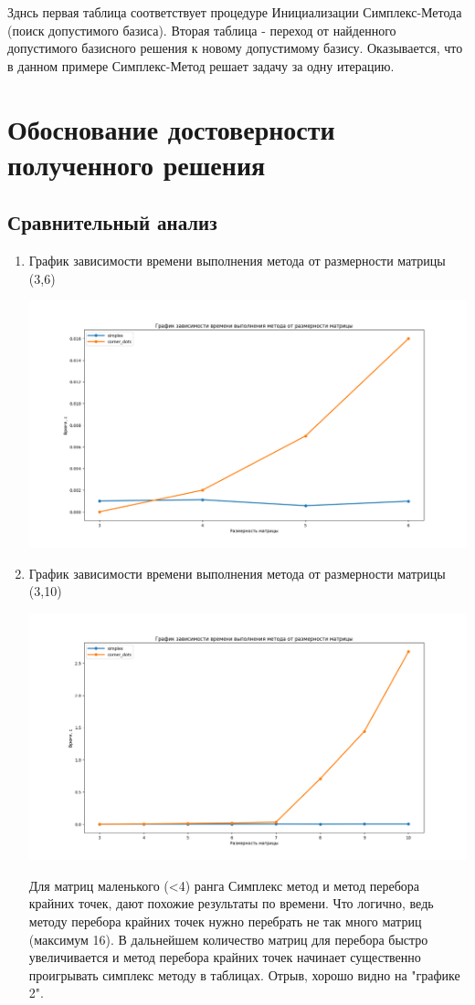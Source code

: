 \documentclass{article}
\begin{document}
    Зднсь первая таблица соответствует процедуре Инициализации Симплекс-Метода (поиск допустимого базиса). Вторая таблица - переход от найденного допустимого базисного решения к новому допустимому базису. Оказывается, что в данном примере Симплекс-Метод решает задачу за одну итерацию.

\newpage
	\section{Обоснование достоверности полученного решения}
    \subsection{Сравнительный анализ}
    \begin{enumerate}
        \item График зависимости времени выполнения метода от размерности матрицы (3,6)
        \begin{center}
         \includegraphics[width=\textwidth]{../graphics/Time_small_rangs_1.png}
        \end{center}
        \item График зависимости времени выполнения метода от размерности матрицы (3,10)
        \begin{center}
         \includegraphics[width=\textwidth]{../graphics/time_3_11_1.png}
        \end{center}
        Для матриц маленького (<4) ранга Симплекс метод и метод перебора крайних точек,
	дают похожие результаты по времени. Что логично, ведь методу перебора крайних точек
	нужно перебрать не так много матриц (максимум 16). В дальнейшем количество матриц для перебора быстро увеличивается
	и метод перебора крайних точек начинает существенно проигрывать симплекс методу в таблицах.
	Отрыв, хорошо видно на "графике 2".



\end{enumerate}
\end{document}
